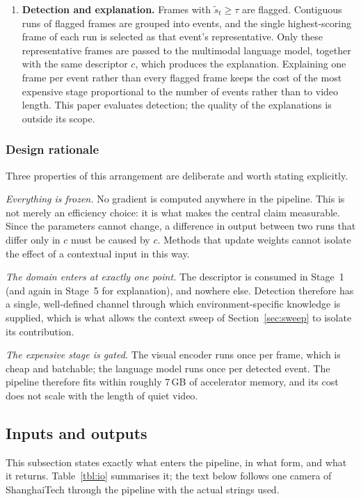 \documentclass[a4paper,fleqn]{cas-sc}
\begin{document}
\begin{enumerate}[{Stage}~1.]
  \item \textbf{Detection and explanation.} Frames with
        $\tilde{s}_t \ge \tau$ are flagged. Contiguous runs of flagged frames are
        grouped into events, and the single highest-scoring frame of each run is
        selected as that event's representative. Only these representative frames
        are passed to the multimodal language model, together with the same
        descriptor $c$, which produces the explanation. Explaining one frame per
        event rather than every flagged frame keeps the cost of the most
        expensive stage proportional to the number of events rather than to video
        length. This paper evaluates detection; the quality of the explanations
        is outside its scope.
\end{enumerate}

\subsubsection{Design rationale}
Three properties of this arrangement are deliberate and worth stating explicitly.

\emph{Everything is frozen.} No gradient is computed anywhere in the pipeline.
This is not merely an efficiency choice: it is what makes the central claim
measurable. Since the parameters cannot change, a difference in output between
two runs that differ only in $c$ must be caused by $c$. Methods that update
weights cannot isolate the effect of a contextual input in this way.

\emph{The domain enters at exactly one point.} The descriptor is consumed in
Stage~1 (and again in Stage~5 for explanation), and nowhere else. Detection
therefore has a single, well-defined channel through which environment-specific
knowledge is supplied, which is what allows the context sweep of
Section~\ref{sec:sweep} to isolate its contribution.

\emph{The expensive stage is gated.} The visual encoder runs once per frame,
which is cheap and batchable; the language model runs once per detected event.
The pipeline therefore fits within roughly 7\,GB of accelerator memory, and its
cost does not scale with the length of quiet video.

\subsection{Inputs and outputs}
\label{sec:io}
This subsection states exactly what enters the pipeline, in what form, and what
it returns. Table~\ref{tbl:io} summarises it; the text below follows one camera
of ShanghaiTech through the pipeline with the actual strings used.
\end{document}
